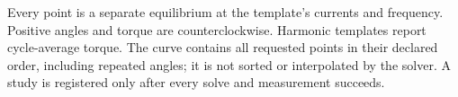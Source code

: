 \begin{codeexample}[width=6cm]
\femmanglestudy[name=reference-sweep,
  template=reference-gap,
  angles={0,15,...,90}]
\begin{tikzpicture}
  \begin{axis}[width=6cm,height=4.5cm,
    xlabel={Rotor angle (degrees)},
    ylabel={Torque (N m)},grid=major]
    \femmstudyplot[study=reference-sweep,
      plot options={blue!65!black,mark=*}]
  \end{axis}
\end{tikzpicture}
\end{codeexample}

Every point is a separate equilibrium at the template's currents and frequency.
Positive angles and torque are counterclockwise. Harmonic templates report
cycle-average torque. The curve contains all requested points in their declared
order, including repeated angles; it is not sorted or interpolated by the solver.
A study is registered only after every solve and measurement succeeds.

